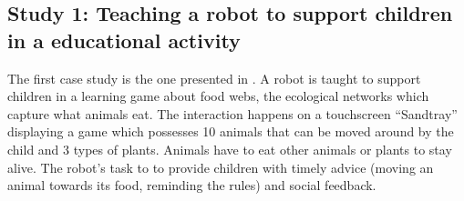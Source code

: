 \documentclass[manuscript, review, anonymous]{acmart}
\begin{document}
\subsection{Study 1: Teaching a robot to support children in a educational activity}

The first case study is the one presented in \cite{senft2019teaching}. A robot is taught to support 
children in a learning game about food webs, the ecological networks which capture what animals eat. The interaction happens on a touchscreen ``Sandtray''
\cite{baxter2012touchscreen} displaying a game which possesses 10 animals that can be 
moved around by the child and 3 types of plants. Animals have to eat other animals or plants to stay 
alive. The robot's task to to provide children with timely advice (moving an animal towards its food,
reminding the rules) and social feedback.
\end{document}
